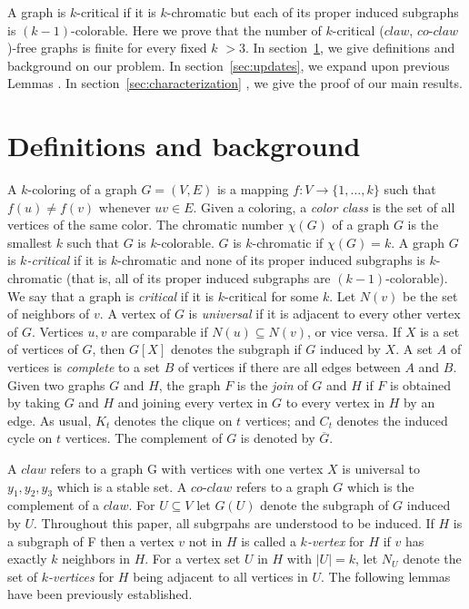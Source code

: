 \documentclass[12pt]{article}
\def\CCO{($claw$, $co$-$claw$)}
\begin{document}
A graph is $k$-critical if it is $k$-chromatic but each of its proper induced subgraphs is $(k-1)$-colorable. Here we prove that the number of $k$-critical {\CCO}-free graphs is finite for every fixed $k$ $ > 3$.
In section~\ref{sec:definitions}, we give definitions and background on our problem. In section~\ref{sec:updates}, we expand upon previous Lemmas \cite{BraFud2002}. In section~\ref{sec:characterization} , we give the proof of our main results. 

\section{Definitions and background}\label{sec:definitions} 
A $k$-coloring of a graph $G=(V,E)$ is a mapping $f: V \rightarrow \{1,\ldots, k\}$ such that $f(u) \not= f(v)$ whenever $uv \in E$. Given a coloring, a {\it color class} is the set of all vertices of the same color.  The chromatic number $\chi(G)$ of a graph $G$ is the smallest $k$ such that $G$ is $k$-colorable.  $G$ is $k$-chromatic if $\chi(G) = k$.  A graph $G$ is {\em $k$-critical} if it is $k$-chromatic and none of its proper induced subgraphs is $k$-chromatic (that is, all of its proper induced subgraphs are $(k-1)$-colorable).  We say that a graph is {\it critical} if it is $k$-critical for some $k$.  Let $N(v)$ be the set of neighbors of $v$. A vertex of $G$ is {\it universal} if it is adjacent to every other vertex of $G$. Vertices $u,v$ are comparable if $N(u) \subseteq N(v)$, or vice versa. If $X$ is a set of vertices of $G$, then $G[X]$ denotes the subgraph if $G$ induced by $X$.  A set $A$ of vertices is {\it complete} to a set $B$ of vertices if there are all edges between $A$ and $B$.  Given two graphs $G$ and $ H$, the graph $F$ is the {\it join} of $G$ and $H$ if $F$ is obtained by taking $G$ and $H$ and joining every vertex in $G$ to every vertex in $H$ by an edge.  As usual, $K_t$ denotes the clique on $t$ vertices; and $C_t$ denotes the induced cycle on $t$ vertices. The complement of $G$ is denoted by $\overline{G}$. 

A $claw$ refers to a graph G with vertices with one vertex $X$ is universal to {$y_1,y_2,y_3$} which is a stable set. A $co$-$claw$ refers to a graph $G$ which is the complement of a $claw$. For $U \subseteq V$ let $G(U)$ denote the subgraph of $G$ induced by $U$. Throughout this paper, all subgrpahs are understood to be induced. If $H$ is a subgraph of F then a vertex $v$ not in $H$ is called a {\em $k$-vertex} for $H$ if $v$ has exactly $k$ neighbors in $H$. For a vertex set $U$ in $H$ with $|U| = k$, let $N_U$ denote the set of {\em $k$-vertices} for $H$ being adjacent to all vertices in $U$.  The following lemmas have been previously established.
\end{document}
